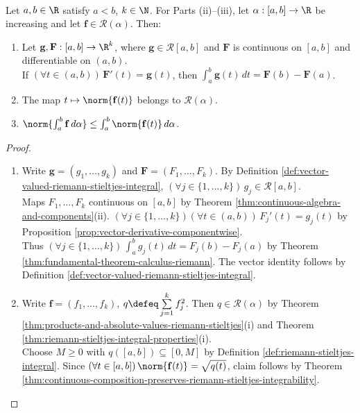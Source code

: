 \begin{theorem} \label{thm:vector-valued-integral-results} \\
Let $a,b\in\R$ satisfy $a<b$, $k\in\N$. For Parts (ii)--(iii), let $\alpha:[a,b]\to\R$ be increasing and let $\mathbf{f}\in\mathcal{R}(\alpha)$. Then:
\begin{enumerate}[label=(\roman*)]
\setlength{\itemsep}{0pt}
\item Let $\mathbf{g},\mathbf{F}:[a,b]\to\R^k$, where $\mathbf{g}\in\mathcal{R}[a,b]$ and $\mathbf{F}$ is continuous on $[a,b]$ and differentiable on $(a,b)$.\\
If $(\forall t\in(a,b))\,\mathbf{F}'(t)=\mathbf{g}(t)$, then $\int_a^b\mathbf{g}(t)\,dt=\mathbf{F}(b)-\mathbf{F}(a)$.
\item The map $t\mapsto\norm{\mathbf{f}(t)}$ belongs to $\mathcal{R}(\alpha)$.
\item $\norm{\int_a^b\mathbf{f}\,d\alpha}\leq\int_a^b\norm{\mathbf{f}(t)}\,d\alpha$.
\end{enumerate}
\begin{proof}
\begin{enumerate}[label=(\roman*)]
\setlength{\itemsep}{0pt}
\item Write $\mathbf{g}=(g_1,\ldots,g_k)$ and $\mathbf{F}=(F_1,\ldots,F_k)$. By Definition \ref{def:vector-valued-riemann-stieltjes-integral}, $(\forall j\in\{1,\ldots,k\})\,g_j\in\mathcal{R}[a,b]$.\\
Maps $F_1,\ldots,F_k$ continuous on $[a,b]$ by Theorem \ref{thm:continuous-algebra-and-components}(ii). $(\forall j\in\{1,\ldots,k\})(\forall t\in(a,b))\,F_j'(t)=g_j(t)$ by Proposition \ref{prop:vector-derivative-componentwise}.\\
Thus $(\forall j\in\{1,\ldots,k\})\,\int_a^b g_j(t)\,dt=F_j(b)-F_j(a)$ by Theorem \ref{thm:fundamental-theorem-calculus-riemann}. The vector identity follows by Definition \ref{def:vector-valued-riemann-stieltjes-integral}.
\item Write $\mathbf{f}=(f_1,\ldots,f_k)$, $q\defeq\sum\limits_{j=1}^{k}f_j^2$. Then $q\in\mathcal{R}(\alpha)$ by Theorem \ref{thm:products-and-absolute-values-riemann-stieltjes}(i) and Theorem \ref{thm:riemann-stieltjes-integral-properties}(i).\\
Choose $M\geq0$ with $q([a,b])\subseteq[0,M]$ by Definition \ref{def:riemann-stieltjes-integral}. Since $(\forall t\in[a,b])\,\norm{\mathbf{f}(t)}=\sqrt{q(t)}$, claim follows by Theorem \ref{thm:continuous-composition-preserves-riemann-stieltjes-integrability}.

\end{enumerate}
\end{proof}
\end{theorem}
